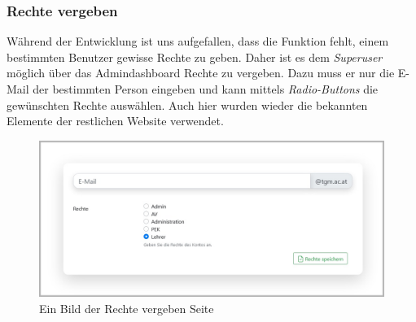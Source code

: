 \newpage 
\subsubsection{Rechte vergeben}
Während der Entwicklung ist uns aufgefallen, dass die Funktion fehlt, einem bestimmten Benutzer gewisse Rechte zu geben. Daher ist es dem \textit{Superuser} möglich über das Admindashboard Rechte zu vergeben. Dazu muss er nur die E-Mail der bestimmten Person eingeben und kann mittels \textit{Radio-Buttons} die gewünschten Rechte auswählen. Auch hier wurden wieder die bekannten Elemente der restlichen Website verwendet.
\begin{figure}[H]
	\centering
	\includegraphics[width=1\linewidth]{images/website/rechte}
	\caption[Neuer Schulantrag]{Ein Bild der Rechte vergeben Seite}
	\label{fig:rightssite}
\end{figure}